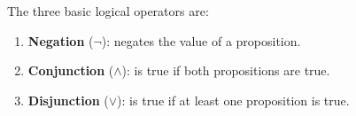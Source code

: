 \documentclass[oneside,11pt,dvipsnames]{book}
\renewcommand{\implies}{\Rightarrow}
\begin{document}
            
The three basic logical operators are:
\begin{enumerate}
    \item \textbf{Negation} ($\neg$): negates the value of a proposition. 
    \item \textbf{Conjunction} ($\wedge$): is true if both propositions are true.
    \item \textbf{Disjunction} ($\vee$): is true if at least one proposition is true. 
\end{enumerate}
\end{document}
